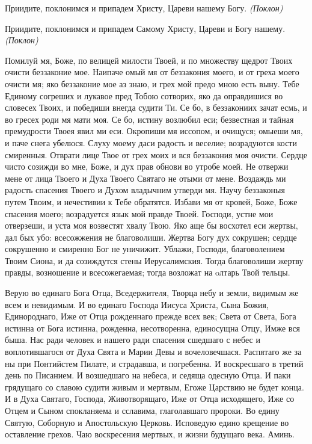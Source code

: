 Приидите, поклонимся и припадем Христу, Цареви нашему Богу. \itshape (Поклон)\normalfont{} 


Приидите, поклонимся и припадем Самому Христу, Цареви и Богу нашему. \itshape (Поклон)\normalfont{}




Помилуй мя, Боже, по велицей милости Твоей, и по множеству щедрот Твоих очисти беззаконие мое. Наипаче омый мя от беззакония моего, и от греха моего очисти мя; яко беззаконие мое аз знаю, и грех мой предо мною есть выну. Тебе Единому согреших и лукавое пред Тобою сотворих, яко да оправдишися во словесех Твоих, и победиши внегда судити Ти. Се бо, в беззакониих зачат есмь, и во гресех роди мя мати моя. Се бо, истину возлюбил еси; безвестная и тайная премудрости Твоея явил ми еси. Окропиши мя иссопом, и очищуся; омыеши мя, и паче снега убелюся. Слуху моему даси радость и веселие; возрадуются кости смиренныя. Отврати лице Твое от грех моих и вся беззакония моя очисти. Сердце чисто созижди во мне, Боже, и дух прав обнови во утробе моей. Не отвержи мене от лица Твоего и Духа Твоего Святаго не отыми от мене. Воздаждь ми радость спасения Твоего и Духом владычним утверди мя. Научу беззаконыя путем Твоим, и нечестивии к Тебе обратятся. Избави мя от кровей, Боже, Боже спасения моего; возрадуется язык мой правде Твоей. Господи, устне мои отверзеши, и уста моя возвестят хвалу Твою. Яко аще бы восхотел еси жертвы, дал бых убо: всесожжения не благоволиши. Жертва Богу дух сокрушен; сердце сокрушенно и смиренно Бог не уничижит. Ублажи, Господи, благоволением Твоим Сиона, и да созиждутся стены Иерусалимския. Тогда благоволиши жертву правды, возношение и всесожегаемая; тогда возложат на oлтарь Твой тельцы.



  Верую во единаго Бога Отца, Вседержителя, Творца небу и земли, видимым же всем и невидимым.
  И во единаго Господа Иисуса Христа, Сына Божия, Единороднаго, Иже от Отца рожденнаго прежде всех век; Света от Света, Бога истинна от Бога истинна, рожденна, несотворенна, единосущна Отцу, Имже вся быша.
  Нас ради человек и нашего ради спасения сшедшаго с небес и воплотившагося от Духа Свята и Марии Девы и вочеловечшася.
  Распятаго же за ны при Понтийстем Пилате, и страдавша, и погребенна.
  И воскресшаго в третий день по Писанием.
  И возшедшаго на небеса, и седяща одесную Отца.
  И паки грядущаго со славою судити живым и мертвым, Егоже Царствию не будет конца.
  И в Духа Святаго, Господа, Животворящаго, Иже от Отца исходящего, Иже со Отцем и Сыном спокланяема и сславима, глаголавшаго пророки.
  Во едину Святую, Соборную и Апостольскую Церковь.
  Исповедую едино крещение во оставление грехов.
  Чаю воскресения мертвых, и жизни будущаго века. Аминь.
  

